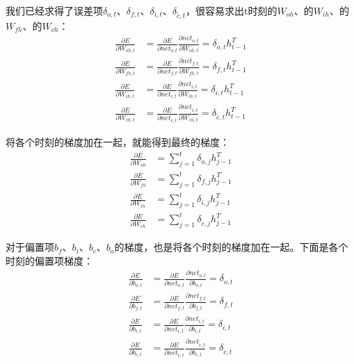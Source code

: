 我们已经求得了误差项\(\delta_{o,t}\)、\(\delta_{f,t}\)、\(\delta_{i,t}\)、\(\delta_{\tilde{c},t}\)，很容易求出t时刻的\(W_{oh}\)、的\(W_{ih}\)、的\(W_{fh}\)、的\(W_{ch}\)：
\begin{align*}
	\frac{\partial{E}}{\partial{W_{oh,t}}} & =\frac{\partial{E}}{\partial{{net}_{o,t}}}\frac{\partial{{net}_{o,t}}}{\partial{W_{oh,t}}}=\delta_{o,t}{h}_{t-1}^T                         \\
	\frac{\partial{E}}{\partial{W_{fh,t}}} & =\frac{\partial{E}}{\partial{{net}_{f,t}}}\frac{\partial{{net}_{f,t}}}{\partial{W_{fh,t}}}=\delta_{f,t}{h}_{t-1}^T                         \\
	\frac{\partial{E}}{\partial{W_{ih,t}}} & =\frac{\partial{E}}{\partial{{net}_{i,t}}}\frac{\partial{{net}_{i,t}}}{\partial{W_{ih,t}}}=\delta_{i,t}{h}_{t-1}^T                         \\
	\frac{\partial{E}}{\partial{W_{ch,t}}} & =\frac{\partial{E}}{\partial{{net}_{\tilde{c},t}}}\frac{\partial{{net}_{\tilde{c},t}}}{\partial{W_{ch,t}}}=\delta_{\tilde{c},t}{h}_{t-1}^T
\end{align*}

将各个时刻的梯度加在一起，就能得到最终的梯度：
\begin{align*}
	\frac{\partial{E}}{\partial{W_{oh}}} & =\sum_{j=1}^t\delta_{o,j}{h}_{j-1}^T         \\
	\frac{\partial{E}}{\partial{W_{fh}}} & =\sum_{j=1}^t\delta_{f,j}{h}_{j-1}^T         \\
	\frac{\partial{E}}{\partial{W_{ih}}} & =\sum_{j=1}^t\delta_{i,j}{h}_{j-1}^T         \\
	\frac{\partial{E}}{\partial{W_{ch}}} & =\sum_{j=1}^t\delta_{\tilde{c},j}{h}_{j-1}^T
\end{align*}

对于偏置项\({b}_f\)、\({b}_i\)、\({b}_c\)、\({b}_o\)的梯度，也是将各个时刻的梯度加在一起。下面是各个时刻的偏置项梯度：
\begin{align*}
	\frac{\partial{E}}{\partial{{b}_{o,t}}} & =\frac{\partial{E}}{\partial{{net}_{o,t}}}\frac{\partial{{net}_{o,t}}}{\partial{{b}_{o,t}}}=\delta_{o,t}                         \\
	\frac{\partial{E}}{\partial{{b}_{f,t}}} & =\frac{\partial{E}}{\partial{{net}_{f,t}}}\frac{\partial{{net}_{f,t}}}{\partial{{b}_{f,t}}}=\delta_{f,t}                         \\
	\frac{\partial{E}}{\partial{{b}_{i,t}}} & =\frac{\partial{E}}{\partial{{net}_{i,t}}}\frac{\partial{{net}_{i,t}}}{\partial{{b}_{i,t}}}=\delta_{i,t}                         \\
	\frac{\partial{E}}{\partial{{b}_{c,t}}} & =\frac{\partial{E}}{\partial{{net}_{\tilde{c},t}}}\frac{\partial{{net}_{\tilde{c},t}}}{\partial{{b}_{c,t}}}=\delta_{\tilde{c},t}
\end{align*}

